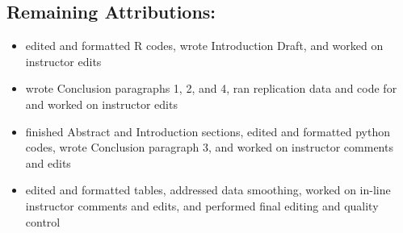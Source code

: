 \subsection{Remaining Attributions:}
\begin{itemize}
    \item {} edited and formatted R codes, wrote Introduction Draft, and worked on instructor edits
    \item {} wrote Conclusion paragraphs 1, 2, and 4, ran replication data and code for \citep{Cavallo2015} and worked on instructor edits
    \item {} finished Abstract and Introduction sections, edited and formatted python codes, wrote Conclusion paragraph 3, and worked on instructor comments and edits
    \item {} edited and formatted tables, addressed data smoothing, worked on in-line instructor comments and edits, and performed final editing and quality control
\end{itemize}